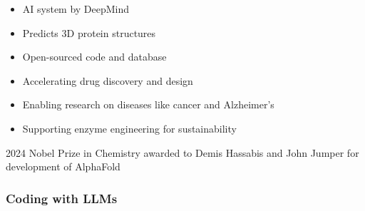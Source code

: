 \begin{frame}

    \begin{itemize}
        \item AI system by DeepMind 
            \vspace{0.5em}
        \item Predicts 3D protein structures
            \vspace{0.5em}
        \item Open-sourced code and database 
            \vspace{0.5em}
        \item Accelerating drug discovery and design
            \vspace{0.5em}
        \item Enabling research on diseases like cancer and Alzheimer's
            \vspace{0.5em}
        \item Supporting enzyme engineering for sustainability
    \end{itemize}

            \vspace{0.5em}
            \vspace{0.5em}
            \vspace{0.5em}
    2024 Nobel Prize in Chemistry awarded to Demis Hassabis and John
    Jumper for development of AlphaFold

\end{frame}



\begin{frame}
    \frametitle{Coding with LLMs}
    
    \begin{figure}
       \centering
    \end{figure}

\end{frame}


